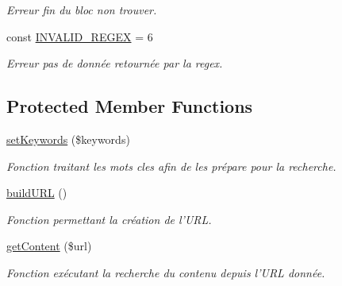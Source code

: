 \begin{DoxyCompactItemize}
\begin{DoxyCompactList}\small\item\em Erreur fin du bloc non trouver. \end{DoxyCompactList}\item 
\hypertarget{class_generic_images_downloader_aa6db587586065f8e2cc80947844b19bc}{const \hyperlink{class_generic_images_downloader_aa6db587586065f8e2cc80947844b19bc}{I\-N\-V\-A\-L\-I\-D\-\_\-\-R\-E\-G\-E\-X} = 6}\label{class_generic_images_downloader_aa6db587586065f8e2cc80947844b19bc}

\begin{DoxyCompactList}\small\item\em Erreur pas de donnée retournée par la regex. \end{DoxyCompactList}\end{DoxyCompactItemize}
\subsection*{Protected Member Functions}
\begin{DoxyCompactItemize}
\item 
\hyperlink{class_generic_images_downloader_a90110a2b38b48e2ffd2a907bb7e06e3c}{set\-Keywords} (\$keywords)
\begin{DoxyCompactList}\small\item\em Fonction traitant les mots cles afin de les prépare pour la recherche. \end{DoxyCompactList}\item 
\hypertarget{class_generic_images_downloader_a3a3e8ed69a7a72d69950426ec9424a64}{\hyperlink{class_generic_images_downloader_a3a3e8ed69a7a72d69950426ec9424a64}{build\-U\-R\-L} ()}\label{class_generic_images_downloader_a3a3e8ed69a7a72d69950426ec9424a64}

\begin{DoxyCompactList}\small\item\em Fonction permettant la création de l'U\-R\-L. \end{DoxyCompactList}\item 
\hyperlink{class_generic_images_downloader_a52c22363fbbda749c84c270a471f904e}{get\-Content} (\$url)
\begin{DoxyCompactList}\small\item\em Fonction exécutant la recherche du contenu depuis l'U\-R\-L donnée. \end{DoxyCompactList}\end{DoxyCompactItemize}

